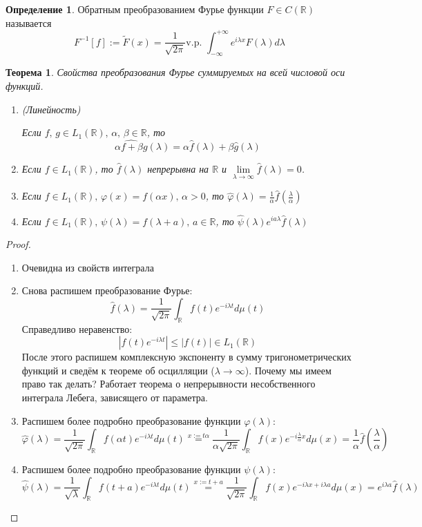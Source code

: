 \documentclass[a4paper,12pt]{article}
\renewcommand{\phi}{\ensuremath{\varphi}}
\renewcommand{\leq}{\ensuremath{\leqslant}}
\theoremstyle{plain}
\newtheorem{theorem}{Теорема}[section]
\theoremstyle{definition}
\newtheorem{definition}{Определение}[section]
\theoremstyle{remark}
\begin{document}
\begin{definition}
	Обратным преобразованием Фурье функции $F \in C(\mathbb{R})$ называется 
	\[F^{-1}[f] := \tilde{F}(x) = \frac{1}{\sqrt{2\pi}} \text{v.p. }\int_{-\infty}^{+\infty}e^{i\lambda x}F(\lambda)d\lambda\]
\end{definition}

\begin{theorem}
	Свойства преобразования Фурье суммируемых на всей числовой оси функций.

	\begin{enumerate}
		\item (Линейность)
		
		Если $f,\,g \in L_1(\mathbb{R}),\, \alpha,\, \beta \in \mathbb{R}$, то
		\[\widehat{\alpha f + \beta g}(\lambda) = \alpha\hat{f}(\lambda) + \beta\hat{g}(\lambda)\]
		\item Если $f \in L_1(\mathbb{R})$, то $\hat{f}(\lambda)$ непрерывна на $\mathbb{R}$ и $\lim\limits_{\lambda \to \infty}\hat{f}(\lambda) = 0$.
		\item Если $f \in L_1(\mathbb{R}),\, \phi(x) = f(\alpha x),\, \alpha > 0$, то $\hat{\phi}(\lambda) = \frac{1}{\alpha}\hat{f}(\frac{\lambda}{\alpha})$
		\item Если $f \in L_1(\mathbb{R}),\, \psi(\lambda) = f(\lambda + a),\, a \in \mathbb{R}$, то $\hat{\psi}(\lambda)e^{ia\lambda}\hat{f}(\lambda)$
	\end{enumerate}
\end{theorem}
\begin{proof}
	\begin{enumerate}
		\item Очевидна из свойств интеграла
		\item Снова распишем преобразование Фурье:
		\[\hat{f}(\lambda) = \frac{1}{\sqrt{2\pi}}\int_\mathbb{R} f(t)e^{-i\lambda t}d\mu(t)\]
		Справедливо неравенство:
		\[|f(t)e^{-i\lambda t}| \leq |f(t)| \in L_1(\mathbb{R})\]
		После этого распишем комплексную экспоненту в сумму тригонометрических функций и сведём к теореме об осцилляции ($\lambda \to \infty$). Почему мы имеем право так делать? Работает теорема о непрерывности несобственного интеграла Лебега, зависящего от параметра.
		\item Распишем более подробно преобразование функции $\phi(\lambda)$:
		\[\hat{\phi}(\lambda) = \frac{1}{\sqrt{2\pi}}\int_\mathbb{R} f(\alpha t)e^{-i\lambda t}d\mu(t) \stackrel{x := t\alpha}{=} \frac{1}{\alpha\sqrt{2\pi}}\int_\mathbb{R}f(x)e^{-i\frac{\lambda}{\alpha}x}d\mu(x) = \frac{1}{\alpha}\hat{f}(\frac{\lambda}{\alpha})\]
		\item Распишем более подробно преобразование функции $\psi(\lambda)$:
		\[\hat{\psi}(\lambda) = \frac{1}{\sqrt{\lambda}}\int_\mathbb{R} f(t + a)e^{-i\lambda t}d\mu(t) \stackrel{x := t + a}{=} \frac{1}{\sqrt{2\pi}}\int_\mathbb{R}f(x)e^{-i\lambda x + i\lambda a}d\mu(x) = e^{i\lambda a}\hat{f}(\lambda)\]
	\end{enumerate}
\end{proof}
\end{document}

